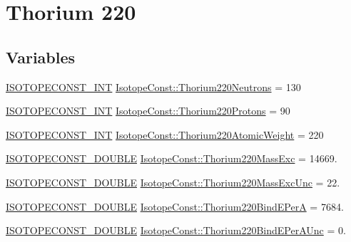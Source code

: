 \hypertarget{group___isotope_const-_thorium-_th220}{}\section{Thorium 220}
\label{group___isotope_const-_thorium-_th220}
\subsection*{Variables}
\begin{DoxyCompactItemize}
\item 
\mbox{\hyperlink{group___isotope_const-_macros_ga5f18360b3e99483a35c32d789e62621c}{I\+S\+O\+T\+O\+P\+E\+C\+O\+N\+S\+T\+\_\+\+I\+NT}} \mbox{\hyperlink{group___isotope_const-_thorium-_th220_ga30dcb71cf8ebe4ae7393601c2d137f98}{Isotope\+Const\+::\+Thorium220\+Neutrons}} = 130
\item 
\mbox{\hyperlink{group___isotope_const-_macros_ga5f18360b3e99483a35c32d789e62621c}{I\+S\+O\+T\+O\+P\+E\+C\+O\+N\+S\+T\+\_\+\+I\+NT}} \mbox{\hyperlink{group___isotope_const-_thorium-_th220_ga35957b68378821a9b3b7eed8641485a5}{Isotope\+Const\+::\+Thorium220\+Protons}} = 90
\item 
\mbox{\hyperlink{group___isotope_const-_macros_ga5f18360b3e99483a35c32d789e62621c}{I\+S\+O\+T\+O\+P\+E\+C\+O\+N\+S\+T\+\_\+\+I\+NT}} \mbox{\hyperlink{group___isotope_const-_thorium-_th220_gafd8934df7269b6bb1ce643e87bf4a0ff}{Isotope\+Const\+::\+Thorium220\+Atomic\+Weight}} = 220
\item 
\mbox{\hyperlink{group___isotope_const-_macros_ga8f45a7272ce02c0b4c65c44636ed719a}{I\+S\+O\+T\+O\+P\+E\+C\+O\+N\+S\+T\+\_\+\+D\+O\+U\+B\+LE}} \mbox{\hyperlink{group___isotope_const-_thorium-_th220_ga6dd991f883e9c8033c43bd1459366dfc}{Isotope\+Const\+::\+Thorium220\+Mass\+Exc}} = 14669.
\item 
\mbox{\hyperlink{group___isotope_const-_macros_ga8f45a7272ce02c0b4c65c44636ed719a}{I\+S\+O\+T\+O\+P\+E\+C\+O\+N\+S\+T\+\_\+\+D\+O\+U\+B\+LE}} \mbox{\hyperlink{group___isotope_const-_thorium-_th220_ga834d0f830e543274a711fe05883c407b}{Isotope\+Const\+::\+Thorium220\+Mass\+Exc\+Unc}} = 22.
\item 
\mbox{\hyperlink{group___isotope_const-_macros_ga8f45a7272ce02c0b4c65c44636ed719a}{I\+S\+O\+T\+O\+P\+E\+C\+O\+N\+S\+T\+\_\+\+D\+O\+U\+B\+LE}} \mbox{\hyperlink{group___isotope_const-_thorium-_th220_gaa04b7c9d9288a5f1bce9eb50e9abbdae}{Isotope\+Const\+::\+Thorium220\+Bind\+E\+PerA}} = 7684.
\item 
\mbox{\hyperlink{group___isotope_const-_macros_ga8f45a7272ce02c0b4c65c44636ed719a}{I\+S\+O\+T\+O\+P\+E\+C\+O\+N\+S\+T\+\_\+\+D\+O\+U\+B\+LE}} \mbox{\hyperlink{group___isotope_const-_thorium-_th220_ga73d27f2f92894f2dc5ec62362e1a7419}{Isotope\+Const\+::\+Thorium220\+Bind\+E\+Per\+A\+Unc}} = 0.

\end{DoxyCompactItemize}
